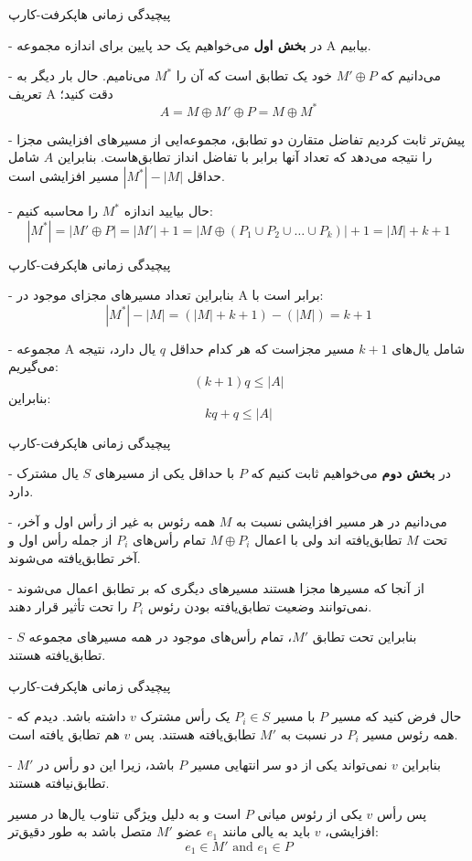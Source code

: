 \begin{itemframe}{‌پیچیدگی زمانی هاپکرفت-کارپ}
\item[-]
در \textbf{بخش اول} می‌خواهیم یک حد پایین برای اندازه مجموعه A بیابیم.
\item[-]
می‌دانیم که $M' \oplus P$ خود یک تطابق است که آن را $M^*$ می‌نامیم. حال بار دیگر به تعریف A دقت کنید؛
$$
A = M \oplus M' \oplus P = M \oplus M^*
$$
\item[-]
پیش‌تر ثابت کردیم تفاضل متقارن دو تطابق، مجموعه‌ایی از مسیر‌های افزایشی مجزا را نتیجه می‌دهد که تعداد آنها برابر با تفاضل انداز تطابق‌هاست. بنابراین $A$ شامل حداقل $|M^*| - |M|$ مسیر افزایشی است.
\item[-]
 حال بیایید اندازه $M^*$ را محاسبه کنیم:
$$
|M^*| =  |M' \oplus P| = |M'| + 1 = |M \oplus (P_1 \cup P_2 \cup \dots \cup P_k)| + 1= |M| + k + 1
$$
\end{itemframe}


\begin{itemframe}{‌پیچیدگی زمانی هاپکرفت-کارپ}
\item[-]
بنابراین تعداد مسیرهای مجزای موجود در A برابر است با:
$$
|M^*| - |M| = (|M| + k + 1) - (|M|) = k + 1
$$

\item[-]
مجموعه A شامل یال‌های
$k + 1$
مسیر مجزاست که هر کدام حداقل $q$ یال دارد، نتیجه می‌گیریم:
$$
(k + 1)q \leq |A|
$$
بنابراین:
$$
kq + q \leq |A|
$$
\end{itemframe}


\begin{itemframe}{‌پیچیدگی زمانی هاپکرفت-کارپ}
\item[-]
در \textbf{بخش دوم } می‌خواهیم ثابت کنیم که $P$ با حداقل یکی از مسیرهای $S$ یال مشترک دارد.
\item[-]
می‌دانیم در هر مسیر افزایشی نسبت به $M$ همه رئوس به غیر از رأس اول و آخر، تحت $M$ تطابق‌یافته اند ولی با اعمال
$M \oplus P_i$
 تمام رأس‌های $P_i$ از جمله رأس اول و آخر تطابق‌یافته می‌شوند.
\item[-]
 از آنجا که مسیرها مجزا هستند مسیرهای دیگری که بر تطابق اعمال می‌شوند نمی‌توانند وضعیت تطابق‌یافته بودن رئوس $P_i$ را تحت تأثیر قرار دهند.
\item[-]
 بنابراین تحت تطابق $M'$، تمام رأس‌های موجود در همه مسیرهای مجموعه $S$ تطابق‌یافته هستند.
\end{itemframe}


\begin{itemframe}{‌پیچیدگی زمانی هاپکرفت-کارپ}
\item[-]
 حال فرض کنید که مسیر $P$ با مسیر $P_i \in S$ یک رأس مشترک $v$ داشته باشد. دیدم که همه رئوس مسیر $P_i$ در نسبت به $M'$‌ تطابق‌یافته هستند. پس $v$ هم تطابق یافته است.
\item[-]
بنابراین $v$ نمی‌تواند یکی از دو سر انتهایی مسیر $P$ باشد، زیرا این دو رأس در $M'$ تطابق‌نیافته هستند.

پس رأس $v$ یکی از رئوس میانی $P$ است و به دلیل ویژگی تناوب یال‌ها در مسیر افزایشی، $v$ باید به یالی مانند
$e_1$
عضو $M'$ متصل باشد به طور دقیق‌تر:
$$e_1 \in M' \text{ and } e_1 \in P$$

\end{itemframe}


